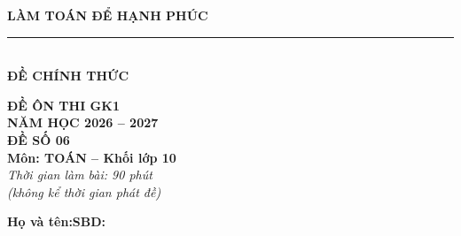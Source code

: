 \documentclass[12pt,a4paper]{article}
\begin{document}
\noindent
\begin{minipage}[c]{0.38\textwidth}
    \centering
    \textbf{LÀM TOÁN ĐỂ HẠNH PHÚC}\\[-2pt]
    \rule{3.2cm}{0.6pt}\\[4pt]
    \textbf{ĐỀ CHÍNH THỨC}
\end{minipage}\hfill
\begin{minipage}[c]{0.35\textwidth}
    \centering
    \textbf{ĐỀ ÔN THI GK1}\\
    \textbf{NĂM HỌC 2026 -- 2027}\\[2pt]
    \textbf{ĐỀ SỐ 06}\\
    \textbf{Môn: TOÁN -- Khối lớp 10}\\
    \textit{\small Thời gian làm bài: 90 phút\\(không kể thời gian phát đề)}
\end{minipage}

\vspace{0.2cm}
\noindent
\begin{minipage}[b]{0.78\textwidth}
    \textbf{Họ và tên:}\dotfill\textbf{SBD:}\makebox[3.5cm]{\dotfill}
\end{minipage}\hfill
\begin{minipage}[b]{0.20\textwidth}
    \hfill
    \setlength{\fboxrule}{0.8pt}%
\end{minipage}
\vspace{0.2cm}
\end{document}
